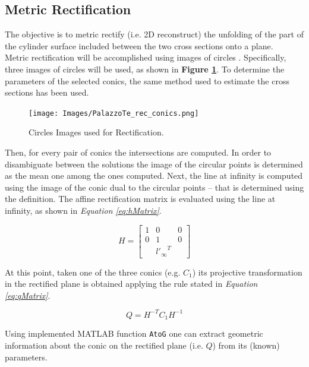 \documentclass[12pt,a4paper]{article}
\begin{document}
\subsection{Metric Rectification}
\label{sec:shapeReconstruction}
The objective is to metric rectify (i.e. 2D reconstruct) the unfolding of the part of the cylinder surface included between the two cross sections onto a plane.\\

Metric rectification will be accomplished using images of circles \cite{MetRecCircles}. Specifically, three images of circles will be used, as shown in \textbf{Figure \ref{fig:recConics}}. To determine the parameters of the selected conics, the same method used to estimate the cross sections has been used.

\begin{figure}[H]
    \centering
    \texttt{[image: Images/PalazzoTe\_rec\_conics.png]}
    \caption[Circles Images used for Rectification.]{Circles Images used for Rectification.}
    \label{fig:recConics}
\end{figure}

Then, for every pair of conics the intersections are computed. In order to disambiguate between the solutions the image of the circular points is determined as the mean one among the ones computed. Next, the line at infinity is computed using the image of the conic dual to the circular points -- that is determined using the definition. The affine rectification matrix is evaluated using the line at infinity, as shown in \textit{Equation \ref{eq:hMatrix}}.

\begin{equation}
    H = 
    \begin{bmatrix}
    1 & 0 & 0\\
    0 & 1 & 0\\
    & {l'_\infty}^T &
    \end{bmatrix}
    \label{eq:hMatrix}
\end{equation}
\bigskip

At this point, taken one of the three conics (e.g. $C_1$) its projective transformation in the rectified plane is obtained applying the rule stated in \textit{Equation \ref{eq:qMatrix}}.

\begin{equation}
    Q = H^{-T}C_1H^{-1}
    \label{eq:qMatrix}
\end{equation}
\bigskip

Using implemented MATLAB function \verb|AtoG| one can extract geometric information about the conic on the rectified plane (i.e. $Q$) from its (known) parameters.
\end{document}
